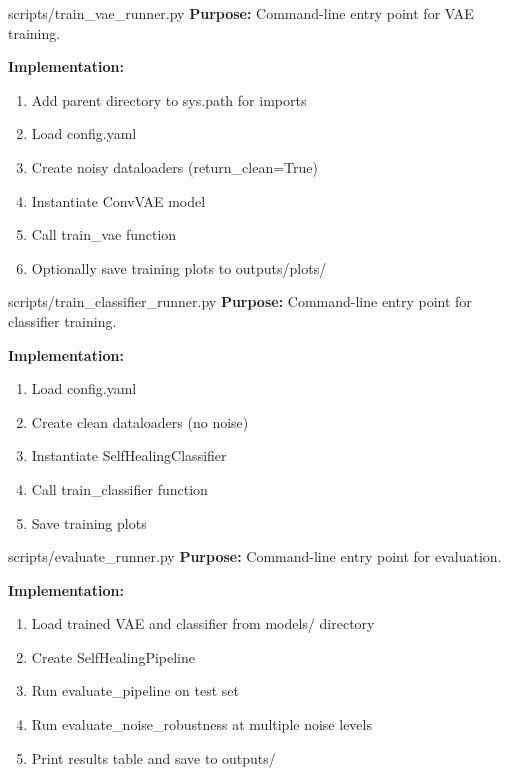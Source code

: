 \documentclass[11pt,a4paper]{article}
\begin{document}
\begin{filebox}{scripts/train\_vae\_runner.py}
\textbf{Purpose:} Command-line entry point for VAE training.

\textbf{Implementation:}
\begin{enumerate}[noitemsep]
    \item Add parent directory to sys.path for imports
    \item Load config.yaml
    \item Create noisy dataloaders (return\_clean=True)
    \item Instantiate ConvVAE model
    \item Call train\_vae function
    \item Optionally save training plots to outputs/plots/
\end{enumerate}
\end{filebox}

\vspace{0.3cm}

\begin{filebox}{scripts/train\_classifier\_runner.py}
\textbf{Purpose:} Command-line entry point for classifier training.

\textbf{Implementation:}
\begin{enumerate}[noitemsep]
    \item Load config.yaml
    \item Create clean dataloaders (no noise)
    \item Instantiate SelfHealingClassifier
    \item Call train\_classifier function
    \item Save training plots
\end{enumerate}
\end{filebox}

\vspace{0.3cm}

\begin{filebox}{scripts/evaluate\_runner.py}
\textbf{Purpose:} Command-line entry point for evaluation.

\textbf{Implementation:}
\begin{enumerate}[noitemsep]
    \item Load trained VAE and classifier from models/ directory
    \item Create SelfHealingPipeline
    \item Run evaluate\_pipeline on test set
    \item Run evaluate\_noise\_robustness at multiple noise levels
    \item Print results table and save to outputs/
\end{enumerate}
\end{filebox}
\end{document}
